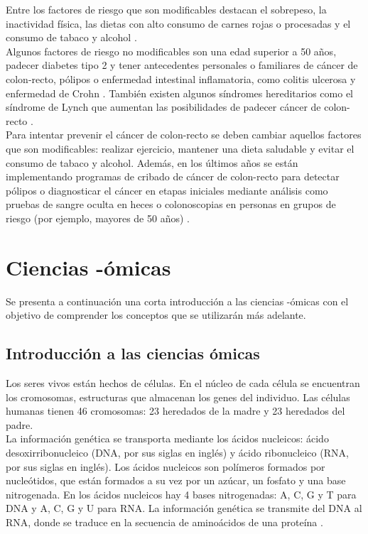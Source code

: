 Entre los factores de riesgo que son modificables destacan el sobrepeso, la inactividad física, las dietas con alto consumo de carnes rojas o procesadas y el consumo de tabaco y alcohol \cite{AmericanCancerSociety2020}.\\

Algunos factores de riesgo no modificables son una edad superior a 50 años, padecer diabetes tipo 2 y tener antecedentes personales o familiares de cáncer de colon-recto, pólipos o enfermedad intestinal inflamatoria, como colitis ulcerosa y enfermedad de Crohn \cite{AmericanCancerSociety2020}. También existen algunos síndromes hereditarios como el síndrome de Lynch que aumentan las posibilidades de padecer cáncer de colon-recto \cite{Lynch2003}.\\

Para intentar prevenir el cáncer de colon-recto se deben cambiar aquellos factores que son modificables: realizar ejercicio, mantener una dieta saludable y evitar el consumo de tabaco y alcohol. Además, en los últimos años se están implementando programas de cribado de cáncer de colon-recto para detectar pólipos o diagnosticar el cáncer en etapas iniciales mediante análisis como pruebas de sangre oculta en heces o colonoscopias en personas en grupos de riesgo (por ejemplo, mayores de 50 años) \cite{Levin2008}.\\


\section{Ciencias -ómicas}

Se presenta a continuación una corta introducción a las ciencias -ómicas con el objetivo de comprender los conceptos que se utilizarán más adelante.

\subsection{Introducción a las ciencias ómicas}

Los seres vivos están hechos de células. En el núcleo de cada célula se encuentran los cromosomas, estructuras que almacenan los genes del individuo. Las células humanas tienen 46 cromosomas: 23 heredados de la madre y 23 heredados del padre.\\

La información genética se transporta mediante los ácidos nucleicos: ácido desoxirribonucleico (DNA, por sus siglas en inglés) y ácido ribonucleico (RNA, por sus siglas en inglés). Los ácidos nucleicos son polímeros formados por nucleótidos, que están formados a su vez por un azúcar, un fosfato y una base nitrogenada. En los ácidos nucleicos hay 4 bases nitrogenadas: A, C, G y T para DNA y A, C, G y U para RNA. La información genética se transmite del DNA al RNA, donde se traduce en la secuencia de aminoácidos de una proteína \cite{Pierce2010}.


